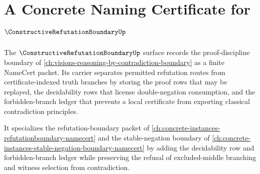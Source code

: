 \chapter{A Concrete Naming Certificate for $\ConstructiveRefutationBoundaryUp$}
\label{ch:concrete-instances-constructiverefutation-boundary-namecert}

The $\ConstructiveRefutationBoundaryUp$ surface records the proof-discipline boundary of \autoref{ch:visions-reasoning-by-contradiction-boundary} as a finite NameCert packet. Its carrier separates permitted refutation routes from certificate-indexed truth branches by storing the proof rows that may be replayed, the decidability rows that license double-negation consumption, and the forbidden-branch ledger that prevents a local certificate from exporting classical contradiction principles.

It specializes the refutation-boundary packet of \autoref{ch:concrete-instances-refutationboundary-namecert} and the stable-negation boundary of \autoref{ch:concrete-instances-stable-negation-boundary-namecert} by adding the decidability row and forbidden-branch ledger while preserving the refusal of excluded-middle branching and witness selection from contradiction.

